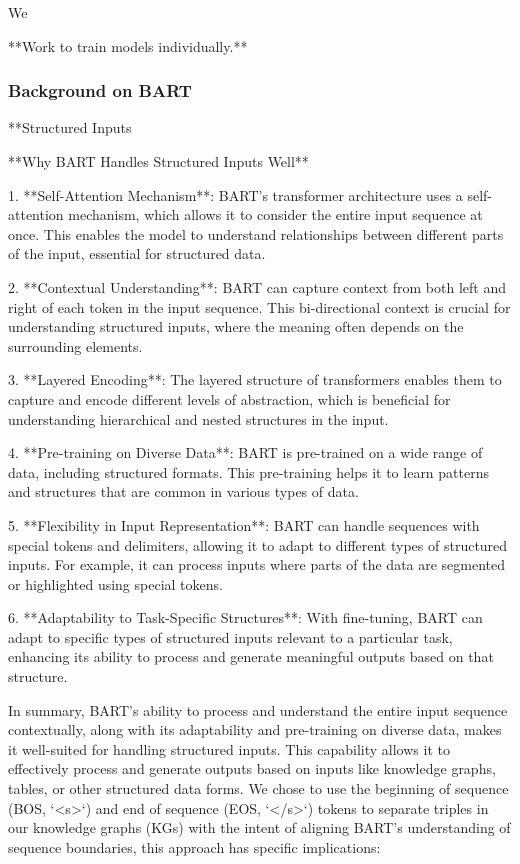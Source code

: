 \documentclass[12pt]{article}
\begin{document}
We 


**Work to train models individually.**
\subsubsection{Background on BART}

**Structured Inputs



**Why BART Handles Structured Inputs Well**

1. **Self-Attention Mechanism**: BART's transformer architecture uses a self-attention mechanism, which allows it to consider the entire input sequence at once. This enables the model to understand relationships between different parts of the input, essential for structured data.

2. **Contextual Understanding**: BART can capture context from both left and right of each token in the input sequence. This bi-directional context is crucial for understanding structured inputs, where the meaning often depends on the surrounding elements.

3. **Layered Encoding**: The layered structure of transformers enables them to capture and encode different levels of abstraction, which is beneficial for understanding hierarchical and nested structures in the input.

4. **Pre-training on Diverse Data**: BART is pre-trained on a wide range of data, including structured formats. This pre-training helps it to learn patterns and structures that are common in various types of data.

5. **Flexibility in Input Representation**: BART can handle sequences with special tokens and delimiters, allowing it to adapt to different types of structured inputs. For example, it can process inputs where parts of the data are segmented or highlighted using special tokens.

6. **Adaptability to Task-Specific Structures**: With fine-tuning, BART can adapt to specific types of structured inputs relevant to a particular task, enhancing its ability to process and generate meaningful outputs based on that structure.

In summary, BART's ability to process and understand the entire input sequence contextually, along with its adaptability and pre-training on diverse data, makes it well-suited for handling structured inputs. This capability allows it to effectively process and generate outputs based on inputs like knowledge graphs, tables, or other structured data forms.
We chose to use the beginning of sequence (BOS, `<s>`) and end of sequence (EOS, `</s>`) tokens to separate triples in our knowledge graphs (KGs) with the intent of aligning BART's understanding of sequence boundaries, this approach has specific implications:
\end{document}
